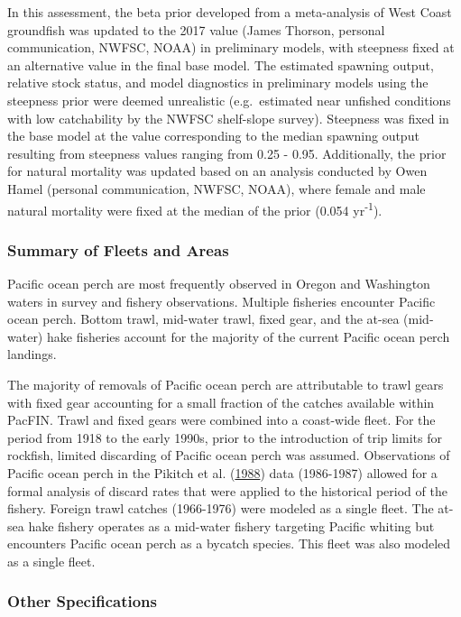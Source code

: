 \documentclass[12pt,]{article}
\begin{document}
In this assessment, the beta prior developed from a meta-analysis of
West Coast groundfish was updated to the 2017 value (James Thorson,
personal communication, NWFSC, NOAA) in preliminary models, with
steepness fixed at an alternative value in the final base model. The
estimated spawning output, relative stock status, and model diagnostics
in preliminary models using the steepness prior were deemed unrealistic
(e.g.~estimated near unfished conditions with low catchability by the
NWFSC shelf-slope survey). Steepness was fixed in the base model at the
value corresponding to the median spawning output resulting from
steepness values ranging from 0.25 - 0.95. Additionally, the prior for
natural mortality was updated based on an analysis conducted by Owen
Hamel (personal communication, NWFSC, NOAA), where female and male
natural mortality were fixed at the median of the prior (0.054
yr\textsuperscript{-1}).

\subsubsection{Summary of Fleets and
Areas}\label{summary-of-fleets-and-areas}

Pacific ocean perch are most frequently observed in Oregon and
Washington waters in survey and fishery observations. Multiple fisheries
encounter Pacific ocean perch. Bottom trawl, mid-water trawl, fixed
gear, and the at-sea (mid-water) hake fisheries account for the majority
of the current Pacific ocean perch landings.

The majority of removals of Pacific ocean perch are attributable to
trawl gears with fixed gear accounting for a small fraction of the
catches available within PacFIN. Trawl and fixed gears were combined
into a coast-wide fleet. For the period from 1918 to the early 1990s,
prior to the introduction of trip limits for rockfish, limited
discarding of Pacific ocean perch was assumed. Observations of Pacific
ocean perch in the Pikitch et al.
(\protect\hyperlink{ref-pikitch_evaluation_1988}{1988}) data (1986-1987)
allowed for a formal analysis of discard rates that were applied to the
historical period of the fishery. Foreign trawl catches (1966-1976) were
modeled as a single fleet. The at-sea hake fishery operates as a
mid-water fishery targeting Pacific whiting but encounters Pacific ocean
perch as a bycatch species. This fleet was also modeled as a single
fleet.

\subsubsection{Other Specifications}\label{other-specifications}
\end{document}
